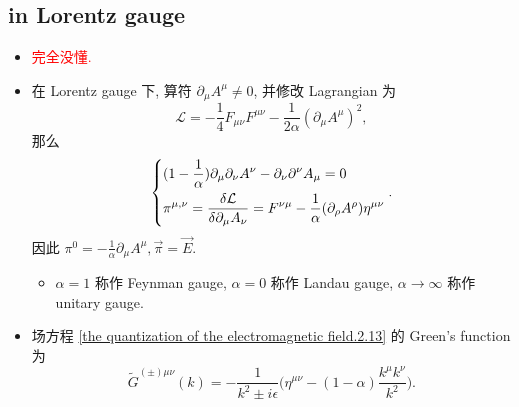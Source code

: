 \subsection{in Lorentz gauge}
\begin{itemize}
	\item \textcolor{red}{完全没懂.}
	
	\item 在 Lorentz gauge 下, 算符 $\partial_\mu A^\mu \neq 0$, 并修改 Lagrangian 为
	\begin{equation}
		\mathcal{L} = - \frac{1}{4} F_{\mu \nu} F^{\mu \nu} - \frac{1}{2 \alpha} (\partial_\mu A^\mu)^2,
	\end{equation}
	那么
	\begin{equation} \label{the quantization of the electromagnetic field.2.13}
		\begin{dcases}
			(1 - \frac{1}{\alpha}) \partial_\mu \partial_\nu A^\nu - \partial_\nu \partial^\nu A_\mu = 0 \\
			\pi^{\mu, \nu} = \frac{\delta \mathcal{L}}{\delta \partial_\mu A_\nu} = F^{\nu \mu} - \frac{1}{\alpha} (\partial_\rho A^\rho) \eta^{\mu \nu}
		\end{dcases}.
	\end{equation}
	因此 $\pi^0 = - \frac{1}{\alpha} \partial_\mu A^\mu, \vec{\pi} = \vec{E}$.
	\begin{itemize}
		\item $\alpha = 1$ 称作 Feynman gauge, $\alpha = 0$ 称作 Landau gauge, $\alpha \rightarrow \infty$ 称作 unitary gauge.
	\end{itemize}
	
	\item 场方程 \eqref{the quantization of the electromagnetic field.2.13} 的 Green's function 为
	\begin{equation}
		\tilde{G}^{(\pm) \mu \nu}(k) = - \frac{1}{k^2 \pm i \epsilon} \Big( \eta^{\mu \nu} - (1 - \alpha) \frac{k^\mu k^\nu}{k^2} \Big).
	\end{equation}
	

\end{itemize}
